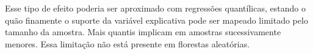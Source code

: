 Esse tipo de efeito poderia ser aproximado com regressões quantílicas, estando o quão finamente o suporte da variável explicativa pode ser mapeado limitado pelo tamanho da amostra. Mais quantis implicam em amostras sucessivamente menores. Essa limitação não está presente em florestas aleatórias. 

\begin{figure}[H]
    \centering
\end{figure}



\begin{figure}[H]
    \centering
    
\end{figure}



